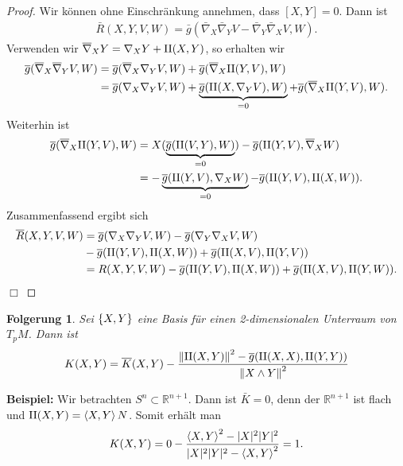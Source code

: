 \documentclass[12pt,a4paper]{article}
\def\R{\mathbb{R}}
\newtheorem{Folgerung}[Lemma]{Folgerung}
\def\qed{\quad\hfill\ensuremath{\Box}}
\begin{document}
\begin{proof}
Wir k\"onnen ohne Einschr\"ankung annehmen, dass $[X,Y] = 0$. Dann ist
\begin{align*}
\bar{R}(X,Y,V,W) = \bar{g}(\bar{\nabla}_{X}\bar{\nabla}_Y V -
\bar{\nabla}_Y\bar{\nabla}_X V,W).
\end{align*}
Verwenden wir $\overline{\nabla}_XY = \nabla_X Y  +\mathrm{II}(X,Y)$, so erhalten wir
\begin{align*}
\overline{g}(\overline{\nabla}_{X}\overline{\nabla}_Y V,W) &= 
\overline{g}(\overline{\nabla}_X\nabla_Y V, W) 
+ \overline{g}(\overline{\nabla}_X \mathrm{II}(Y,V),W)\\
&=
\overline{g}(\nabla_X\nabla_Y V, W) 
+ \underbrace{\overline{g}(\mathrm{II}(X,\nabla_Y V),W)}_{=0} 
+ \overline{g}(\overline{\nabla}_X \mathrm{II}(Y,V),W).
\end{align*}
Weiterhin ist
\begin{align*}
\overline{g}(\overline{\nabla}_X \mathrm{II}(Y,V),W) &= 
X(\underbrace{\overline{g}(\mathrm{II}(V,Y),W)}_{=0}) -
\overline{g}(\mathrm{II}(Y,V),\overline{\nabla}_X W)\\
&= -\underbrace{\overline{g}(\mathrm{II}(Y,V),\nabla_X W)}_{=0}
- \overline{g}(\mathrm{II}(Y,V),\mathrm{II}(X,W)).
\end{align*}
Zusammenfassend ergibt sich
\begin{align*}
\overline{R}(X,Y,V,W) &= \overline{g}(\nabla_X\nabla_Y V, W) - 
\overline{g}(\nabla_Y\nabla_X V, W)\\
&- \overline{g}(\mathrm{II}(Y,V),\mathrm{II}(X,W))
+ \overline{g}(\mathrm{II}(X,V),\mathrm{II}(Y,V))\\
&= R(X,Y,V,W) - \overline{g}(\mathrm{II}(Y,V),\mathrm{II}(X,W))
+ \overline{g}(\mathrm{II}(X,V),\mathrm{II}(Y,W)).
\end{align*}
\qed
\end{proof}

\bigskip

\begin{Folgerung}
Sei $\{X,Y\}$ eine Basis f\"ur einen 2-dimensionalen Unterraum von $T_pM$. Dann
ist
\begin{align*}
K(X,Y) = \overline{K}(X,Y) - \frac{\left\|\mathrm{II}(X,Y)\right\|^2 - \overline{g}(\mathrm{II}(X,X),\mathrm{II}(Y,Y))}{
\left\|X\wedge Y\right\|^2} 
\end{align*}
\end{Folgerung}

\bigskip

{\bf Beispiel:}
Wir betrachten $S^n\subset\R^{n+1}$. Dann ist $\bar{K} = 0$, denn der $\R^{n+1}$
ist flach und $\mathrm{II}(X,Y) =\left\langle X,Y\right\rangle N$. Somit erh\"alt man
\begin{align*}
K(X,Y) = 0 - \frac{\left\langle X,Y\right\rangle^2 - |X|^2|Y|^2}{|X|^2|Y|^2-
\left\langle X,Y\right\rangle^2} = 1.
\end{align*}
\bigskip
\end{document}
